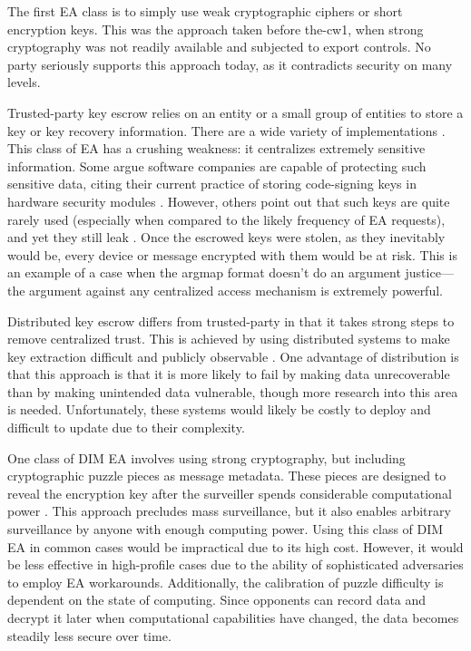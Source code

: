 The first \ac{EA} class is to simply use weak cryptographic ciphers or short encryption keys. This was the approach
taken before \ac{the-cw1}, when strong cryptography was not readily available and subjected to export controls. No party
seriously supports this approach today, as it contradicts security on many levels.

Trusted-party key escrow relies on an entity or a small group of entities to store a key or key recovery information.
There are a wide variety of implementations \cite{denning_taxonomy_1996}. This class of \ac{EA} has a crushing weakness:
it centralizes extremely sensitive information. Some argue software companies are capable of protecting such sensitive
data, citing their current practice of storing code-signing keys in hardware security modules \cite{ozzie_2018}.
However, others point out that such keys are quite rarely used (especially when compared to the likely frequency of
\ac{EA} requests), and yet they still leak \cite{green_2018}. Once the escrowed keys were stolen, as they inevitably
would be, every device or message encrypted with them would be at risk. This is an example of a case when the
\ac{argmap} format doesn't do an argument justice---the argument against any centralized access mechanism is extremely
powerful.

Distributed key escrow differs from trusted-party in that it takes strong steps to remove centralized trust. This is
achieved by using distributed systems to make key extraction difficult and publicly observable \cite{phan_key_2017}
\cite{servan_schreiber_jje_2020}. One advantage of distribution is that this approach is that it is more likely to fail
by making data unrecoverable than by making unintended data vulnerable, though more research into this area is needed.
Unfortunately, these systems would likely be costly to deploy and difficult to update due to their complexity.

One class of \ac{DIM} \ac{EA} involves using strong cryptography, but including cryptographic puzzle pieces as message
metadata. These pieces are designed to reveal the encryption key after the surveiller spends considerable computational
power \cite{bellare_translucent_1996} \cite{wright_crypto_2018}. This approach precludes mass surveillance, but it also
enables arbitrary surveillance by anyone with enough computing power. Using this class of \ac{DIM} \ac{EA} in common
cases would be impractical due to its high cost. However, it would be less effective in high-profile cases due to the
ability of sophisticated adversaries to employ \ac{EA} workarounds. Additionally, the calibration of puzzle difficulty
is dependent on the state of computing. Since opponents can record data and decrypt it later when computational
capabilities have changed, the data becomes steadily less secure over time.

